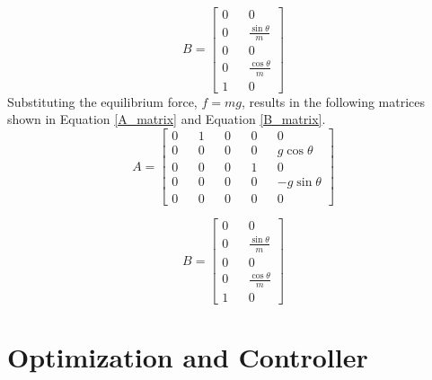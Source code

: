 \documentclass[12pt]{article}
\begin{document}
\begin{equation}
\label{B_matrix_intermediate}
B = \begin{bmatrix} 0 && 0 \\ 0 && \frac{\sin{\theta}}{m} \\ 0 && 0 \\ 0 && \frac{\cos{\theta}}{m} \\ 1 && 0 \end{bmatrix}
\end{equation}
Substituting the equilibrium force, $f = mg$, results in the following matrices shown in Equation \ref{A_matrix} and Equation \ref{B_matrix}.
\begin{equation}
\label{A_matrix}
A = \begin{bmatrix} 0 && 1 && 0 && 0 && 0 \\ 0 && 0 && 0 && 0 && g\cos{\theta} \\  0 && 0 && 0 && 1 && 0 \\ 0 && 0 && 0 && 0 && -g\sin{\theta} \\ 0 && 0 && 0 && 0 && 0 \end{bmatrix}
\end{equation}

\begin{equation}
\label{B_matrix}
B = \begin{bmatrix} 0 && 0 \\ 0 && \frac{\sin{\theta}}{m} \\ 0 && 0 \\ 0 && \frac{\cos{\theta}}{m} \\ 1 && 0 \end{bmatrix}
\end{equation}


\section{Optimization and Controller}




\end{document}
